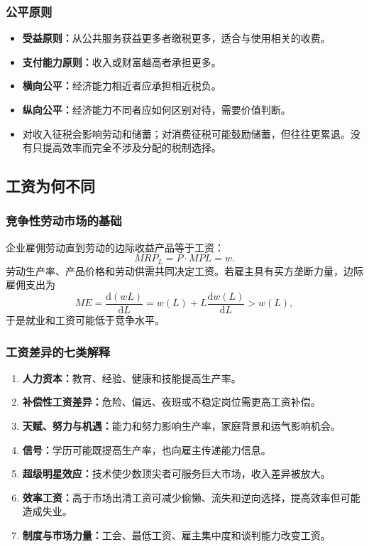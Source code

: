 \documentclass[UTF8,11pt,a4paper]{ctexart}
\newcommand{\term}[1]{\textbf{#1}}
\newcommand{\dd}{\mathrm{d}}
\begin{document}
\subsubsection{公平原则}
\begin{itemize}
  \item \term{受益原则：}从公共服务获益更多者缴税更多，适合与使用相关的收费。
  \item \term{支付能力原则：}收入或财富越高者承担更多。
  \item \term{横向公平：}经济能力相近者应承担相近税负。
  \item \term{纵向公平：}经济能力不同者应如何区别对待，需要价值判断。
  \item 对收入征税会影响劳动和储蓄；对消费征税可能鼓励储蓄，但往往更累退。没有只提高效率而完全不涉及分配的税制选择。
\end{itemize}

\subsection{工资为何不同}
\subsubsection{竞争性劳动市场的基础}
企业雇佣劳动直到劳动的边际收益产品等于工资：
\[
MRP_L=P\cdot MPL=w.
\]
劳动生产率、产品价格和劳动供需共同决定工资。若雇主具有买方垄断力量，边际雇佣支出为
\[
ME=\frac{\dd(wL)}{\dd L}=w(L)+L\frac{\dd w(L)}{\dd L}>w(L),
\]
于是就业和工资可能低于竞争水平。

\subsubsection{工资差异的七类解释}
\begin{enumerate}
  \item \term{人力资本：}教育、经验、健康和技能提高生产率。
  \item \term{补偿性工资差异：}危险、偏远、夜班或不稳定岗位需更高工资补偿。
  \item \term{天赋、努力与机遇：}能力和努力影响生产率，家庭背景和运气影响机会。
  \item \term{信号：}学历可能既提高生产率，也向雇主传递能力信息。
  \item \term{超级明星效应：}技术使少数顶尖者可服务巨大市场，收入差异被放大。
  \item \term{效率工资：}高于市场出清工资可减少偷懒、流失和逆向选择，提高效率但可能造成失业。
  \item \term{制度与市场力量：}工会、最低工资、雇主集中度和谈判能力改变工资。
\end{enumerate}
\end{document}
